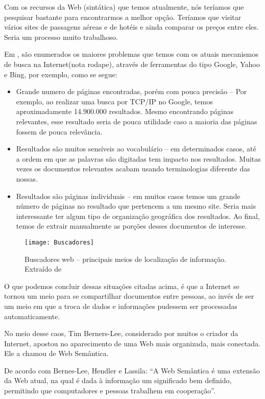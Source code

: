 Com os recursos da  Web (sintática) que temos atualmente, nós teríamos que pesquisar bastante para encontrarmos a melhor opção. Teríamos que visitar vários sites de passagens aéreas e de hotéis e ainda comparar os preços entre eles. Seria um processo muito trabalhoso.

Em \cite{kbreitman}, são enumerados os maiores problemas que temos com os atuais mecanismos de busca na Internet(nota rodape), através de ferramentas do tipo Google, Yahoo e Bing, por exemplo, como se segue:

\begin{itemize}
\item Grande numero de páginas encontradas, porém com pouca precisão – Por exemplo, ao realizar uma busca por TCP/IP no Google, temos aproximadamente 14.900.000 resultados. Mesmo encontrando páginas relevantes, esse resultado seria de pouca utilidade caso a maioria das páginas fossem de pouca relevância.
\item Resultados são muitos sensíveis ao vocabulário – em determinados casos, até a ordem em que as palavras são digitadas tem impacto nos resultados. Muitas vezes os documentos relevantes acabam usando terminologias diferente das nossas.
\item Resultados são páginas individuais – em muitos casos temos um grande número de páginas no resultado que pertencem a um mesmo site. Seria mais interessante ter algum tipo de organização geográfica dos resultados. Ao final, temos de extrair manualmente as porções desses documentos de interesse.
\end{itemize}

\graphicspath{{figuras/}}
\begin{figure}[H]
\centering
\texttt{[image: Buscadores]}
\caption{Buscadores web – principais meios de localização de informação. Extraído de \cite{intwebsem} }
\label{buscadores}
\end{figure}
O que podemos concluir dessas situações citadas acima, é que a Internet se tornou um meio para se compartilhar documentos entre pessoas, ao invés de ser um meio em que a troca de dados e informações pudessem ser processadas automaticamente.

No meio desse caos, Tim Berners-Lee, considerado por muitos o criador da Internet, apostou no aparecimento de uma Web mais organizada, mais conectada. Ele a chamou de Web Semântica.

De acordo com Bernes-Lee, Hendler e Lassila: “A Web Semântica é uma extensão da Web atual, na qual é dada à informação um significado bem definido, permitindo que computadores e pessoas trabalhem em cooperação”.

